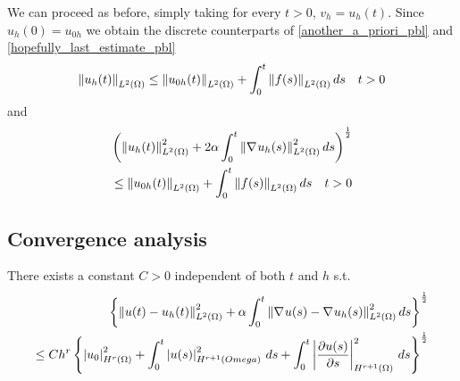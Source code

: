 We can proceed as before, simply taking for every \(t>0\), \(v_h = u_h(t)\). Since \(u_h(0) = u_{0h}\) we obtain the discrete counterparts of \eqref{another_a_priori_pbl} and \eqref{hopefully_last_estimate_pbl} 
\begin{equation}
    \norm{u_h(t)}_{L^2(\Omega)} \leq \norm{u_{0h}(t)}_{L^2(\Omega)} + \int_0^t
    \norm{f(s)}_{L^2(\Omega)} \,ds \quad t > 0
    \label{another_a_priori_disc_pbl}
\end{equation}
and 
\begin{equation}
    \begin{split}
            \left( \norm{u_h(t)}_{L^2(\Omega)}^2 + 2\alpha \int_0^t \norm{\nabla\mspace{1mu} u_h(s)}_{L^2(\Omega)}^2 \, ds\right)^{\frac{1}{2}} \\
            \leq \norm{u_{0h}(t)}_{L^2(\Omega)} + \int_0^t \norm{f(s)}_{L^2(\Omega)} \, ds \quad t > 0
    \end{split}
\end{equation}
\subsection{Convergence analysis}
\begin{theorem}
    There exists a constant \(C > 0\) independent of both \(t\) and \(h\) s.t. 
    \begin{equation*}
        \begin{split}
            \left\{ \ltwonorm{u(t) - u_h(t)}^2 + \alpha \int_0^t \ltwonorm{\grad u(s) -\grad u_h(s)}^2 \, ds \right\}^{\onehalf} \\
            \leq Ch^r \left\{ \seminorm{u_0}{H^r(\Omega)}^2 + \int_0^t \seminorm{u(s)}{H^{r+1}( Omega)}^2 \, ds + \int_0^t \seminorm{\partialderivative{u(s)}{s}}{H^{r+1}(\Omega)}^2 \, ds \right\}^{\onehalf}
        \end{split}
    \end{equation*}
\end{theorem}
